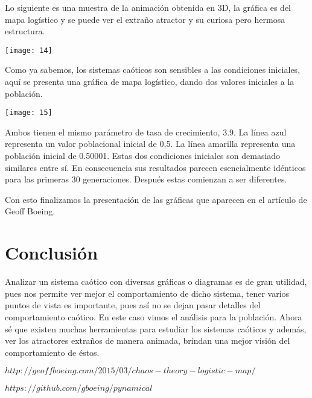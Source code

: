 \documentclass[12pt]{article}
\begin{document}
\begin{doublespace}
Lo siguiente es una muestra de la animación obtenida en 3D, la gráfica es del mapa logístico y se puede ver el extraño atractor y su curiosa pero hermosa estructura.
\begin{center}
\texttt{[image: 14]}
\end{center}

Como ya sabemos, los sistemas caóticos son sensibles a las condiciones iniciales, aquí se presenta una gráfica de mapa logístico, dando dos valores iniciales a la población.

\begin{center}
\texttt{[image: 15]}
\end{center}

Ambos tienen el mismo parámetro de tasa de crecimiento, 3.9. La línea azul representa un valor poblacional inicial de 0,5. La línea amarilla representa una población inicial de 0.50001. Estas dos condiciones iniciales son demasiado similares entre sí. En consecuencia sus resultados parecen esencialmente idénticos para las primeras 30 generaciones. Después estas comienzan a ser diferentes.

Con esto finalizamos la presentación de las gráficas que aparecen en el artículo de Geoff Boeing.

\section{Conclusión}
Analizar un sistema caótico con diversas gráficas o diagramas es de gran utilidad, pues nos permite ver mejor el comportamiento de dicho sistema, tener varios puntos de vista es importante, pues así no se dejan pasar detalles del comportamiento caótico. En este caso vimos el análisis para la población. Ahora sé que existen muchas herramientas para estudiar los sistemas caóticos y además, ver los atractores extraños de manera animada, brindan una mejor visión del comportamiento de éstos.

\newpage
\renewcommand{\refname}{\section{Referencias}}
\begin{thebibliography}{9}
 \textsc{$http://geoffboeing.com/2015/03/chaos-theory-logistic-map/$}

 \textsc{$https://github.com/gboeing/pynamical$}

\end{thebibliography}

\end{doublespace}
\end{document}
